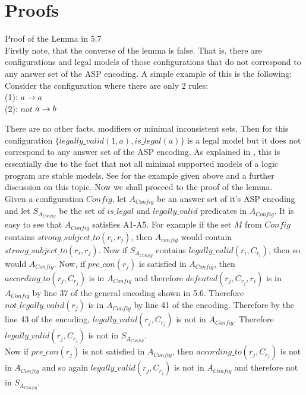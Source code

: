 \section{Proofs}\label{sec:proofs}

Proof of the Lemma in 5.7\\
Firstly note, that the converse of the lemma is false. That is, there are configurations and legal models of those configurations that do not correspond to any answer set of the ASP encoding. A simple example of this is the following: Consider the configuration where there are only 2 rules:\\ (1): $a\rightarrow a$\\
(2): $not$ $a\rightarrow b\\$

There are no other facts, modifiers or minimal inconsistent sets. Then for this configuration $\{legally\_valid(1,a), is\_legal(a)\}$ is a legal model but it does not correspond to any answer set of the ASP encoding. As explained in \cite{KRR_notes}, this is essentially due to the fact that not all minimal supported models of a logic program are stable models. See \cite{KRR_notes} for the example given above and a further discussion on this topic.  Now we shall proceed to the proof of the lemma.\\

Given a configuration $Config$, let $A_{Config}$ be an answer set of it's ASP encoding and let $S_{A_{Config}}$ be the set of $is\_legal$ and $legally\_valid$ predicates in $A_{Config}$. It is easy to see that $A_{Config}$ satisfies A1-A5. For example if the set $M$ from $Config$ contains $strong\_subject\_to(r_{i}, r_{j})$, then $A_{config}$ would contain $strong\_subject\_to(r_{i}, r_{j})$. Now if $S_{A_{Config}}$ contains $legally\_valid(r_{i}, C_{r_{i}})$, then so would $A_{Config}$. Now, if $pre\_con(r_{j})$ is satisfied in $A_{Config}$, then $according\_to(r_{j},C_{r_{j}})$ is in $A_{Config}$ and therefore $defeated(r_{j}, C_{r_{j}}, r_{i})$ is in $A_{Config}$ by line 37 of the general encoding shown in 5.6. Therefore $not\_legally\_valid(r_{j})$ is in $A_{Config}$ by line 41 of the encoding. Therefore by the line 43 of the encoding, $legally\_valid(r_{j},C_{r_{j}})$ is not in $A_{Config}$. Therefore $legally\_valid(r_{j},C_{r_{j}})$ is not in $S_{A_{Config}}$.\\

Now if $pre\_con(r_{j})$ is not satisfied in $A_{Config}$, then $according\_to(r_{j},C_{r_{j}})$ is not in $A_{Config}$ and so again $legally\_valid(r_{j},C_{r_{j}})$ is not in $A_{Config}$ and therefore not in $S_{A_{Config}}$.\\

